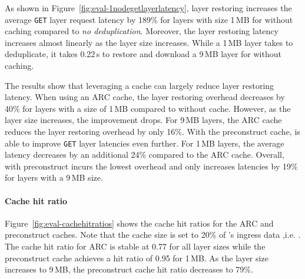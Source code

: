 %
As shown in Figure~\ref{fig:eval-1nodegetlayerlatency}, 
layer restoring increases the average \texttt{GET} layer request latency by 189\% for layers 
with size 1\,MB for \sysname without caching compared to \emph{no deduplication}.
%
Moreover, the layer restoring latency increases almost linearly as the layer size increases.
%
While a 1\,MB layer takes \gap to deduplicate, it takes 0.22\,s to restore and download a 9\,MB
layer for \sysname without caching.

%
The results show that
leveraging a cache can largely reduce layer restoring latency.
%
When using an ARC cache, the layer restoring overhead decreases by 40\% for layers with
a size of 1\,MB compared to \sysname without cache.
%
However, as the layer size increases,  the improvement drops.
%
For 9\,MB layers, the ARC cache reduces the layer restoring overhead by only 16\%.
%
%
With the preconstruct cache, \sysname is able to improve \texttt{GET} layer latencies even further.
%
For 1\,MB layers, the average latency decreases by an additional 24\% compared to the ARC cache.
%
Overall, \sysname with preconstruct incurs the lowest overhead and only increases latencies by
19\% for layers with a 9\,MB size. 

\paragraph{Cache hit ratio}
%
Figure~\ref{fig:eval-cachehitratios} shows the cache hit ratios for the ARC and
preconstruct caches.
%
Note that the cache size is set to 20\% of \dal{}'s ingress data ,i.e. \gap.
%
%
The cache hit ratio for ARC is stable at 0.77 for all layer sizes while
the preconstruct cache achieves a hit ratio of 0.95 for 1\,MB.
%
As the layer size increases to 9\,MB, the preconstruct cache hit ratio decreases to 79\%.

